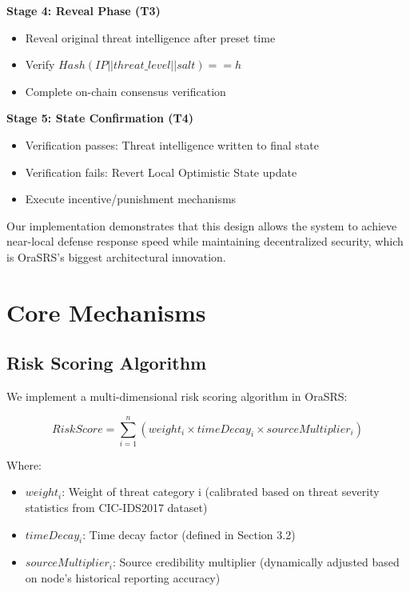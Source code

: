 \documentclass[12pt]{article}
\begin{document}
\textbf{Stage 4: Reveal Phase (T3)}
\begin{itemize}
\item Reveal original threat intelligence after preset time
\item Verify $Hash(IP || threat\_level || salt) == h$
\item Complete on-chain consensus verification
\end{itemize}

\textbf{Stage 5: State Confirmation (T4)}
\begin{itemize}
\item Verification passes: Threat intelligence written to final state
\item Verification fails: Revert Local Optimistic State update
\item Execute incentive/punishment mechanisms
\end{itemize}

Our implementation demonstrates that this design allows the system to achieve near-local defense response speed while maintaining decentralized security, which is OraSRS's biggest architectural innovation.

\section{Core Mechanisms}

\subsection{Risk Scoring Algorithm}

We implement a multi-dimensional risk scoring algorithm in OraSRS:

\begin{equation}
\label{eq:risk_score}
RiskScore = \sum_{i=1}^{n} (weight_i \times timeDecay_i \times sourceMultiplier_i)
\end{equation}

Where:
\begin{itemize}
\item $weight_i$: Weight of threat category i (calibrated based on threat severity statistics from CIC-IDS2017 dataset)
\item $timeDecay_i$: Time decay factor (defined in Section 3.2)
\item $sourceMultiplier_i$: Source credibility multiplier (dynamically adjusted based on node's historical reporting accuracy)
\end{itemize}
\end{document}
